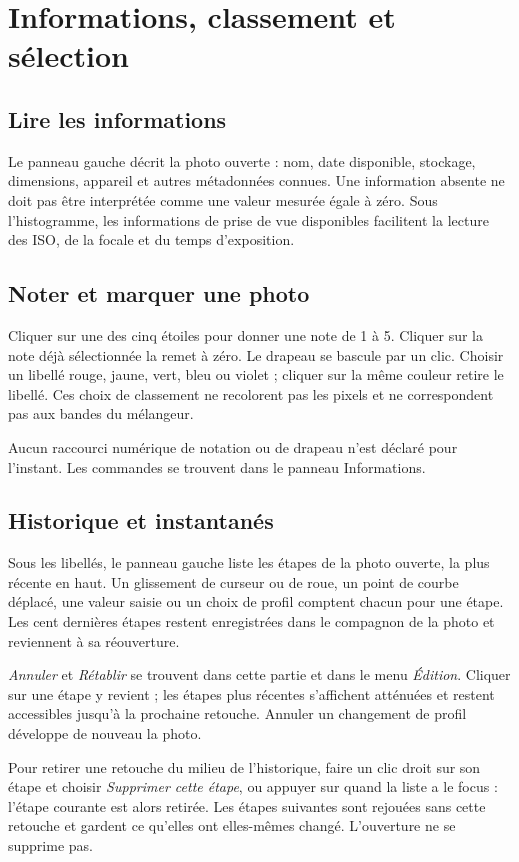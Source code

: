 \chapter{Informations, classement et sélection}
\section{Lire les informations}
Le panneau gauche décrit la photo ouverte : nom, date disponible, stockage,
dimensions, appareil et autres métadonnées connues. Une information absente
ne doit pas être interprétée comme une valeur mesurée égale à zéro.
Sous l’histogramme, les informations de prise de vue disponibles facilitent
la lecture des ISO, de la focale et du temps d’exposition.

\section{Noter et marquer une photo}
Cliquer sur une des cinq étoiles pour donner une note de 1 à 5.
Cliquer sur la note déjà sélectionnée la remet à zéro. Le drapeau se bascule
par un clic. Choisir un libellé rouge, jaune, vert, bleu ou violet ; cliquer
sur la même couleur retire le libellé. Ces choix de classement ne recolorent
pas les pixels et ne correspondent pas aux bandes du mélangeur.

Aucun raccourci numérique de notation ou de drapeau n’est déclaré pour
l’instant. Les commandes se trouvent dans le panneau Informations.

\section{Historique et instantanés}
Sous les libellés, le panneau gauche liste les étapes de la photo ouverte, la
plus récente en haut. Un glissement de curseur ou de roue, un point de courbe
déplacé, une valeur saisie ou un choix de profil comptent chacun pour une étape.
Les cent dernières étapes restent enregistrées dans le compagnon de la photo et
reviennent à sa réouverture.

\emph{Annuler} et \emph{Rétablir} se trouvent dans cette partie et dans le menu
\emph{Édition}. Cliquer sur une étape y revient ; les étapes plus récentes
s’affichent atténuées et restent accessibles jusqu’à la prochaine retouche.
Annuler un changement de profil développe de nouveau la photo.

Pour retirer une retouche du milieu de l’historique, faire un clic droit sur son
étape et choisir \emph{Supprimer cette étape}, ou appuyer sur 
quand la liste a le focus : l’étape courante est alors retirée. Les étapes
suivantes sont rejouées sans cette retouche et gardent ce qu’elles ont
elles-mêmes changé. L’ouverture ne se supprime pas.

